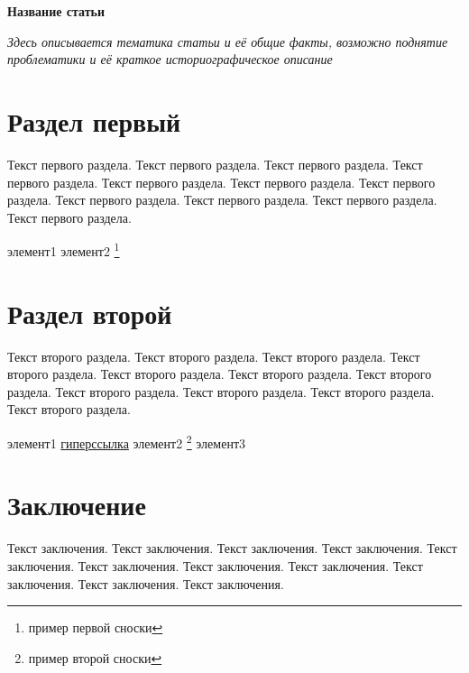 \documentclass[12pt]{article}			%
\begin{document}
\begin{center}
	\Huge{\textbf{Название статьи}}
\end{center}

\hfill

\noindent
\textit{Здесь описывается тематика статьи и её общие факты, возможно поднятие проблематики и её краткое историографическое описание}

\hfill
	
\section{Раздел первый}
Текст первого раздела. Текст первого раздела. Текст первого раздела. Текст первого раздела. Текст первого раздела. Текст первого раздела. Текст первого раздела. Текст первого раздела. Текст первого раздела. Текст первого раздела. Текст первого раздела. 
\begin{outline}[itemize]
	\1 элемент1
	\1 элемент2 \footnote{пример первой сноски}
\end{outline}

\section{Раздел второй}
Текст второго раздела. Текст второго раздела. Текст второго раздела. Текст второго раздела. Текст второго раздела. Текст второго раздела. Текст второго раздела. Текст второго раздела. Текст второго раздела. Текст второго раздела. Текст второго раздела. 
\begin{outline}[enumerate]
	\1 элемент1 \href{https://www.google.com/}{гиперссылка}
	\1 элемент2 \footnote{пример второй сноски}
	\1 элемент3
\end{outline}

\section{Заключение}
Текст заключения. Текст заключения. Текст заключения. Текст заключения. Текст заключения. Текст заключения. Текст заключения. Текст заключения. Текст заключения. Текст заключения. Текст заключения. 
\end{document}
